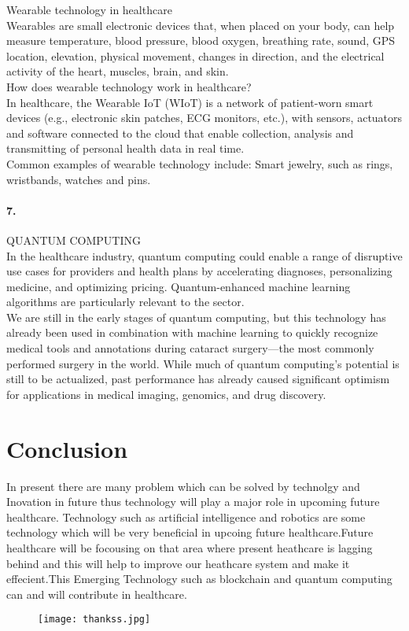 \documentclass[12pt]{report}
\begin{document}
Wearable technology in healthcare\\
Wearables are small electronic devices that, when placed on your body, can help measure temperature, blood pressure, blood oxygen, breathing rate, sound, GPS location, elevation, physical movement, changes in direction, and the electrical activity of the heart, muscles, brain, and skin.\\
How does wearable technology work in healthcare?\\
In healthcare, the Wearable IoT (WIoT) is a network of patient-worn smart devices (e.g., electronic skin patches, ECG monitors, etc.), with sensors, actuators and software connected to the cloud that enable collection, analysis and transmitting of personal health data in real time.\\
Common examples of wearable technology include: Smart jewelry, such as rings, wristbands, watches and pins.\paragraph{7.}
QUANTUM COMPUTING\\
In the healthcare industry, quantum computing could enable a range of disruptive use cases for providers and health plans by accelerating diagnoses, personalizing medicine, and optimizing pricing. Quantum-enhanced machine learning algorithms are particularly relevant to the sector.\\
We are still in the early stages of quantum computing, but this technology has already been used in combination with machine learning to quickly recognize medical tools and annotations during cataract surgery—the most commonly performed surgery in the world. While much of quantum computing’s potential is still to be actualized, past performance has already caused significant optimism for applications in medical imaging, genomics, and drug discovery.




\section{Conclusion}
In present there are many problem which can be solved by technolgy and Inovation in future thus technology will play a major role in upcoming future healthcare. Technology such as artificial intelligence and robotics are some technology which will be very beneficial in upcoing future healthcare.Future healthcare will be focousing on that area where present heathcare is lagging behind and this will help to improve our heathcare system and make it effecient.This Emerging Technology such as blockchain and quantum computing can and will contribute in healthcare.





\clearpage

\begin{figure}
\centering
\texttt{[image: thankss.jpg]}
\end{figure}











\clearpage
\end{document}
